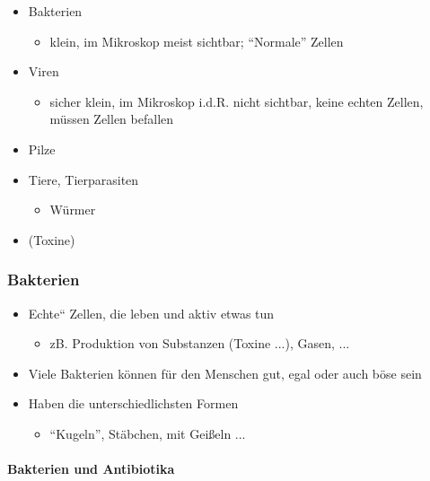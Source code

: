 \begin{itemize}
    \item Bakterien
    \begin{itemize}
        \item klein, im Mikroskop meist sichtbar;
        {\textquotedblleft}Normale{\textquotedblright} Zellen
    \end{itemize}
    \item Viren
    \begin{itemize}
        \item sicher klein, im Mikroskop i.d.R. nicht sichtbar, keine echten
        Zellen, m\"ussen Zellen befallen
    \end{itemize}
    \item Pilze   
    \item Tiere, Tierparasiten
    \begin{itemize}
        \item W\"urmer 
    \end{itemize}
    \item (Toxine)
\end{itemize}


\subsubsection{Bakterien}


\begin{itemize}
    \item {\quotedblbase}Echte{\textquotedblleft} Zellen, die leben und
    aktiv etwas tun
    \begin{itemize}
        \item zB. Produktion von Substanzen (Toxine ...), Gasen, ... 
    \end{itemize}
    \item Viele Bakterien k\"onnen f\"ur den Menschen gut, egal oder auch
    b\"ose sein
    \item Haben die unterschiedlichsten Formen
    \begin{itemize}
        \item {\textquotedblleft}Kugeln{\textquotedblright}, St\"abchen, mit
        Gei{\ss}eln ...
    \end{itemize}
\end{itemize}


\paragraph{Bakterien und Antibiotika}

